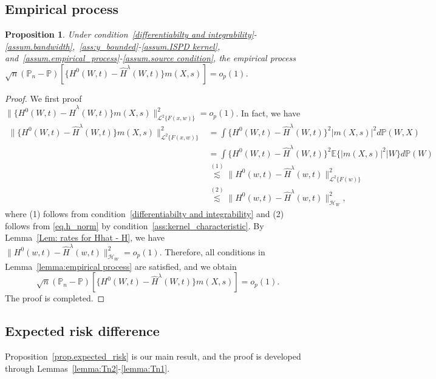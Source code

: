 \documentclass[
  12pt]{article}
\newtheorem{proposition}{Proposition}
\def\cL{\mathcal{L}}
\begin{document}
\subsection{Empirical process}

\begin{proposition}\label{prop.empirical_process}
    Under condition~\ref{differentiabilty and integrability}-\ref{assum.bandwidth},~\ref{ass:y_bounded}-\ref{assum.ISPD kernel}, and~\ref{assum.empirical_process}-\ref{assum.source condition}, the empirical process $  \sqrt{n}( \mathbb{P}_n-\mathbb{P} )[ \{ H^0(W,t) -\widehat{H}^{\lambda}(W,t)\} m(X,s)]=o_{p}(1)$.
\end{proposition}
\begin{proof}
    We first proof $\| \{ H^0(W,t) -\widehat{H}^{\lambda}(W,t)\}m(X,s)\|_{\cL^2\{F(x,w)\}}^{2}=o_{p}(1)$. In fact, we have
    $$
\begin{aligned}
	\| \{ H^0(W,t) -\widehat{H}^{\lambda}(W,t)\} m(X,s) \|_{\cL^2\{F(x,w)\}}^{2}&=\int{\{ H^0(W,t) -\widehat{H}^{\lambda}(W,t)\}^2|m(X,s)|^2d\mathbb{P} (W,X)}\\
	&=\int{\{ H^0(W,t) -\widehat{H}^{\lambda}(W,t)\}^2\mathbb{E} \{|m(X,s)|^2|W\} d\mathbb{P} (W)}\\
	&\overset{(1)}{\lesssim} \| H^0(w,t)-\widehat{H}^{\lambda}(w,t) \|_{\cL^2\{F(w)\}}^{2}\\
    &\overset{(2)}{\lesssim } \| H^0(w,t)-\widehat{H}^{\lambda}(w,t)\|_{\mathcal{H}_W}^{2},
\end{aligned}
$$
where (1) follows from condition~\ref{differentiabilty and integrability} and (2) follows from \eqref{eq.h_norm} by condition~\ref{ass:kernel_characteristic}. By Lemma~\ref{Lem: rates for Hhat - H}, we have $\| H^0(w,t)-\widehat{H}^{\lambda}(w,t) \|_{\mathcal{H}_W}^{2} = o_{p}(1)$. Therefore, all conditions in Lemma~\ref{lemma:empirical process} are satisfied, and we obtain
$$
\sqrt{n}( \mathbb{P}_n-\mathbb{P} )[ \{ H^0(W,t) -\widehat{H}^{\lambda}(W,t)\} m(X,s)] = o_{p}(1).
$$
The proof is completed. 
\end{proof}
\subsection{Expected risk difference}
Proposition~\ref{prop.expected_risk} is our main result, and the proof is developed through Lemmas~\ref{lemma:Tn2}-\ref{lemma:Tn1}. 
\end{document}

